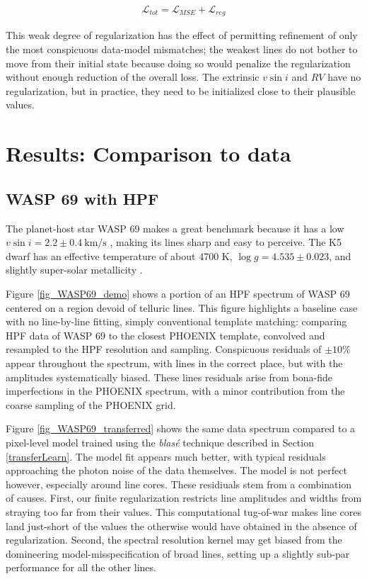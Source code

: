 \documentclass[twocolumn]{aastex631}
\begin{document}
\begin{eqnarray}
    \mathcal{L}_{tot} = \mathcal{L}_{MSE} + \mathcal{L}_{reg}
\end{eqnarray}

This weak degree of regularization has the effect of permitting refinement of only the most conspicuous data-model mismatches; the weakest lines do not bother to move from their initial state because doing so would penalize the regularization without enough reduction of the overall loss.  The extrinsic $v\sin{i}$ and $RV$ have no regularization, but in practice, they need to be initialized close to their plausible values.

\section{Results: Comparison to data}\label{secResults}
\subsection{WASP 69 with HPF}

The planet-host star WASP 69 makes a great benchmark because it has a low $v\sin{i}=2.2\pm0.4~\text{km/s}$ \citep{2017A&A...608A.135C}, making its lines sharp and easy to perceive.  The K5 dwarf has an effective temperature of about 4700 K, $\log{g}=4.535\pm0.023$, and slightly super-solar metallicity \citep{2014MNRAS.445.1114A}.

Figure \ref{fig_WASP69_demo} shows a portion of an HPF spectrum of WASP 69 centered on a region devoid of telluric lines.  This figure highlights a baseline case with no line-by-line fitting, simply conventional template matching: comparing HPF data of WASP 69 to the closest PHOENIX template, convolved and resampled to the HPF resolution and sampling.  Conspicuous residuals of $\pm10\%$ appear throughout the spectrum, with lines in the correct place, but with the amplitudes systematically biased.  These lines residuals arise from bona-fide imperfections in the PHOENIX spectrum, with a minor contribution from the coarse sampling of the PHOENIX grid.

Figure \ref{fig_WASP69_transferred} shows the same data spectrum compared to a pixel-level model trained using the \emph{blas\'e} technique described in Section \ref{transferLearn}.  The model fit appears much better, with typical residuals approaching the photon noise of the data themselves.  The model is not perfect however, especially around line cores.  These residiuals stem from a combination of causes.  First, our finite regularization restricts line amplitudes and widths from straying too far from their values.  This computational tug-of-war makes line cores land just-short of the values the otherwise would have obtained in the absence of regularization.  Second, the spectral resolution kernel may get biased from the domineering model-misspecification of broad lines, setting up a slightly sub-par performance for all the other lines.  
\end{document}
